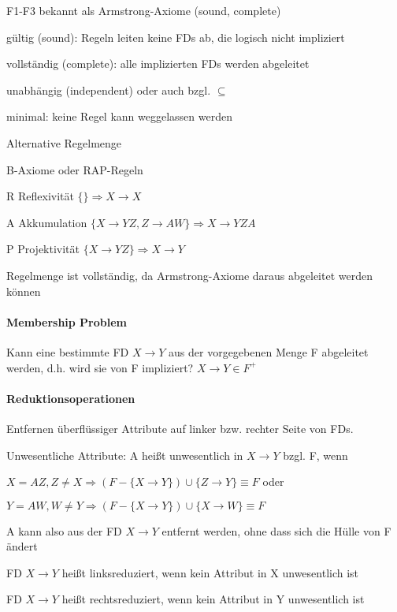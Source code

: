 \documentclass[a4paper]{article}
\begin{document}
\begin{multicols}{3}
    F1-F3 bekannt als Armstrong-Axiome (sound, complete)
    \begin{itemize*}
        \item gültig (sound): Regeln leiten keine FDs ab, die logisch nicht impliziert
        \item vollständig (complete): alle implizierten FDs werden abgeleitet
        \item unabhängig (independent) oder  auch bzgl. $\subseteq$ 
        \item minimal: keine Regel kann weggelassen werden
    \end{itemize*}

    Alternative Regelmenge
    \begin{itemize*}
        \item B-Axiome oder RAP-Regeln
        \begin{itemize*}
            \item R Reflexivität $\{\}\Rightarrow X\rightarrow X$
            \item A Akkumulation $\{X\rightarrow YZ, Z\rightarrow AW\}\Rightarrow X\rightarrow YZA$
            \item P Projektivität $\{X\rightarrow YZ\}\Rightarrow X\rightarrow Y$
        \end{itemize*}
        \item Regelmenge ist vollständig, da Armstrong-Axiome daraus abgeleitet werden können
    \end{itemize*}

    \paragraph{Membership Problem} Kann eine bestimmte FD $X\rightarrow Y$ aus der vorgegebenen Menge F abgeleitet werden, d.h. wird sie von F impliziert? $X\rightarrow Y \in F^+$

    \paragraph*{Reduktionsoperationen} Entfernen überflüssiger Attribute auf linker bzw. rechter Seite von FDs.

    Unwesentliche Attribute: A heißt unwesentlich in $X\rightarrow Y$ bzgl. F, wenn
    \begin{itemize*}
        \item $X=AZ,Z\not= X \Rightarrow (F-\{X\rightarrow Y\})\cup \{Z\rightarrow Y\} \equiv F$ oder
        \item $Y=AW, W\not=Y\Rightarrow (F-\{X\rightarrow Y\})\cup \{X\rightarrow W\} \equiv F$
    \end{itemize*}
    \begin{itemize*}
        \item A kann also aus der FD $X\rightarrow Y$ entfernt werden, ohne dass sich die Hülle von F ändert
        \item FD $X\rightarrow Y$ heißt linksreduziert, wenn kein Attribut in X unwesentlich ist
        \item FD $X\rightarrow Y$ heißt rechtsreduziert, wenn kein Attribut in Y unwesentlich ist
    \end{itemize*}


\end{multicols}
\end{document}
